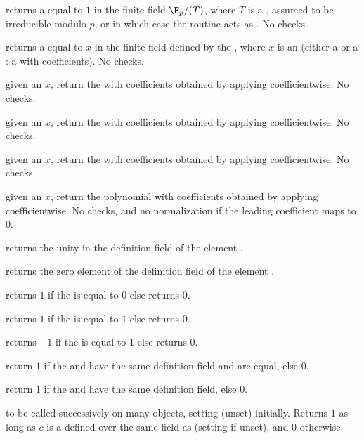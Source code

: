  returns a  equal to $1$ in the
finite field $\F_p/(T)$, where $T$ is a , assumed to be irreducible
modulo $p$, or  in which case the routine acts as .
No checks.

 returns a  equal to $x$
in the finite field defined by the  , where
$x$ is an  (either a  or a : a  with
 coefficients). No checks.

 given an  $x$,
return the  with  coefficients obtained by
applying  coefficientwise. No checks.

 given an  $x$,
return the  with  coefficients obtained by
applying  coefficientwise. No checks.

 given an  $x$,
return the  with  coefficients obtained by
applying  coefficientwise. No checks.

 given an  $x$,
return the polynomial with  coefficients obtained by
applying  coefficientwise. No checks, and no normalization
if the leading coefficient maps to $0$.

 returns the unity in the definition field of the
 element .

 returns the zero element of the definition field of
the  element .

 returns $1$ if the   is equal
to $0$ else returns $0$.

 returns $1$ if the   is equal
to $1$ else returns $0$.

 returns $-1$ if the   is equal
to $1$ else returns $0$.

 return $1$ if the   and
 have the same definition field and are equal, else $0$.

 return $1$ if the   and
 have the same definition field, else $0$.

 to be called successively on many objects,
setting  (unset) initially. Returns $1$ as long as $c$ is a
 defined over the same field as  (setting 
if unset), and $0$ otherwise.

